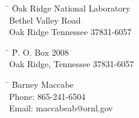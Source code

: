 \thispagestyle{empty}

\begin{center}
\textbf{\Large \baseproposaltitle}
\end{center}

\begin{center}
\end{center}

\medskip

\begin{tabbing}
\hspace*{10mm} \=  \= Oak Ridge National Laboratory \\
\>   Bethel Valley Road\\
\> \> Oak Ridge Tennessee 37831-6057\\
\end{tabbing}


\begin{tabbing}
\hspace*{10mm} \=  \= P. O. Box 2008 \\
\> \> Oak Ridge, Tennessee 37831-6057 \\
\end{tabbing}


\begin{tabbing}
\hspace*{10mm} \=  \= Barney Maccabe \\
\> \> Phone: 865-241-6504 \\
\> \> Email: maccabeab@ornl.gov
\end{tabbing}

